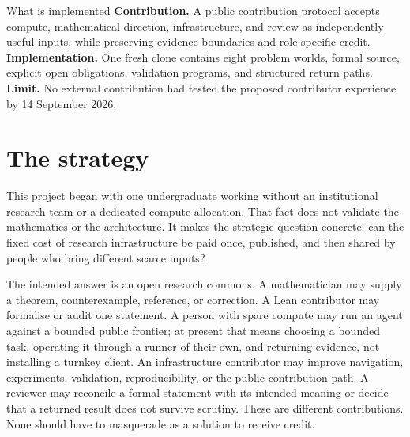 \documentclass[10pt]{article}
\begin{document}
\begin{abstract}
The paper gives a production model, contribution protocol, trust and security
boundary, attribution policy, comparison with volunteer computing,
Polymath-style collaboration, formalisation projects, the Prove2Me platform,
the Aletheia case study, and multi-agent proof systems, and an evaluation
agenda.  Mathematics is the initial domain because
its objects are digital and formal claims can be checked incrementally.  Any
later extension to experimental science would require domain scientists,
physical laboratories, safety governance, and new evidential authorities.
\end{abstract}

\begin{paperresult}{What is implemented}
\textbf{Contribution.} A public contribution protocol accepts compute,
mathematical direction, infrastructure, and review as independently useful
inputs, while preserving evidence boundaries and role-specific credit.
\textbf{Implementation.} One fresh clone contains eight problem worlds,
formal source, explicit open obligations, validation programs, and structured
return paths. \textbf{Limit.} No external contribution had tested the proposed
contributor experience by 14 September 2026.
\end{paperresult}

\section{The strategy}\label{sec:strategy}

This project began with one undergraduate working without an institutional
research team or a dedicated compute allocation.  That fact does not validate
the mathematics or the architecture.  It makes the strategic question
concrete: can the fixed cost of research infrastructure be paid once,
published, and then shared by people who bring different scarce inputs?

The intended answer is an open research commons.  A mathematician may supply
a theorem, counterexample, reference, or correction.  A Lean contributor may
formalise or audit one statement.  A person with spare compute may run an
agent against a bounded public frontier; at present that means choosing a
bounded task, operating it through a runner of their own, and returning
evidence, not installing a turnkey client.  An infrastructure contributor may
improve navigation, experiments, validation, reproducibility, or the public
contribution path.  A reviewer may reconcile a formal statement with its
intended meaning or decide that a returned result does not survive scrutiny.
These are different contributions.  None should have to masquerade as a
solution to receive credit.
\end{document}
